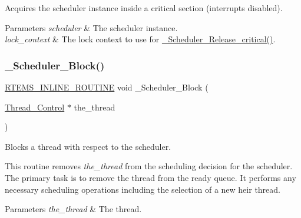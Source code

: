 Acquires the scheduler instance inside a critical section (interrupts disabled). 


\begin{DoxyParams}{Parameters}
{\em scheduler} & The scheduler instance. \\
\hline
{\em lock\+\_\+context} & The lock context to use for \mbox{\hyperlink{group__RTEMSScoreScheduler_gae4d084e50d4f8a616f394312b66df32b}{\+\_\+\+Scheduler\+\_\+\+Release\+\_\+critical()}}. \\
\hline
\end{DoxyParams}
\mbox{\label{group__RTEMSScoreScheduler_gad25705e24ba30f0cb36c0e2999fbfbce}} 
\subsubsection{\texorpdfstring{\_Scheduler\_Block()}{\_Scheduler\_Block()}}
{\footnotesize\ttfamily \mbox{\hyperlink{group__RTEMSScoreBaseDefs_gac216239df231d5dbd15e3520b0b9313f}{R\+T\+E\+M\+S\+\_\+\+I\+N\+L\+I\+N\+E\+\_\+\+R\+O\+U\+T\+I\+NE}} void \+\_\+\+Scheduler\+\_\+\+Block (\begin{DoxyParamCaption}\item[{\mbox{\hyperlink{struct__Thread__Control}{Thread\+\_\+\+Control}} $\ast$}]{the\+\_\+thread }\end{DoxyParamCaption})}



Blocks a thread with respect to the scheduler. 

This routine removes {\itshape the\+\_\+thread} from the scheduling decision for the scheduler. The primary task is to remove the thread from the ready queue. It performs any necessary scheduling operations including the selection of a new heir thread.


\begin{DoxyParams}{Parameters}
{\em the\+\_\+thread} & The thread. \\
\hline
\end{DoxyParams}
\mbox{\label{group__RTEMSScoreScheduler_ga5012b61871058535e8b6bfd316787fd7}} 
